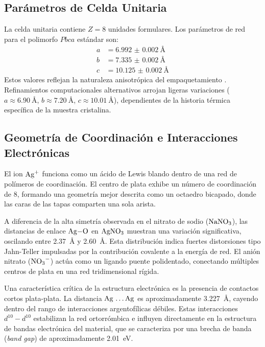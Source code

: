 \documentclass[pdflatex,sn-mathphys-num]{sn-jnl}
\theoremstyle{thmstyleone}%
\theoremstyle{thmstyletwo}%
\theoremstyle{thmstylethree}%
\begin{document}
\subsection{Parámetros de Celda Unitaria}
La celda unitaria contiene $Z=8$ unidades formulares. Los parámetros de red para
el polimorfo $Pbca$ estándar son:
\begin{align}
  a &= \qty{6.992(2)}{\angstrom} \\
  b &= \qty{7.335(2)}{\angstrom} \\
  c &= \qty{10.125(2)}{\angstrom}
\end{align}
Estos valores reflejan la naturaleza anisotrópica del empaquetamiento
\cite{osti_1279797, Persson2012}.
Refinamientos computacionales alternativos arrojan ligeras variaciones ($a
\approx \qty{6.90}{\angstrom}$, $b \approx \qty{7.20}{\angstrom}$, $c \approx
\qty{10.01}{\angstrom}$), dependientes de la historia térmica específica de la
muestra cristalina.

\subsection{Geometría de Coordinación e Interacciones Electrónicas}
El ion $\ce{Ag+}$ funciona como un ácido de Lewis blando dentro de una red de
polímeros de coordinación. El centro de plata exhibe un número de coordinación
de 8, formando una geometría mejor descrita como un octaedro bicapado, donde las
caras de las tapas comparten una sola arista.

A diferencia de la alta simetría observada en el nitrato de sodio ($\ce{NaNO3}$),
las distancias de enlace $\ce{Ag-O}$ en $\ce{AgNO3}$ muestran una variación
significativa, oscilando entre \qty{2.37}{\angstrom} y \qty{2.60}{\angstrom}.
Esta distribución indica fuertes distorsiones tipo Jahn-Teller impulsadas por la
contribución covalente a la energía de red. El anión nitrato ($\ce{NO3-}$) actúa
como un ligando puente polidentado, conectando múltiples centros de plata en una
red tridimensional rígida.

Una característica crítica de la estructura electrónica es la presencia de
contactos cortos plata-plata. La distancia $\ce{Ag \dots Ag}$ es
aproximadamente \qty{3.227}{\angstrom}, cayendo dentro del rango de
interacciones argentofílicas débiles. Estas interacciones $d^{10}-d^{10}$
estabilizan la red ortorrómbica e influyen directamente en la estructura de
bandas electrónica del material, que se caracteriza por una brecha de banda
(\textit{band gap}) de aproximadamente \qty{2.01}{\electronvolt}.
\end{document}
